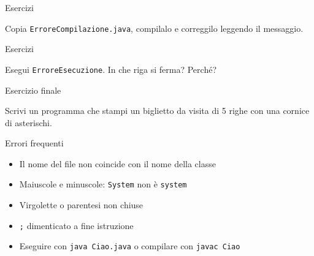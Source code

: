 \documentclass[aspectratio=169,10pt,t]{beamer}
\begin{document}
\begin{frame}{Esercizi}
  \begin{esercizio}
    Copia \texttt{ErroreCompilazione.java}, compilalo e correggilo leggendo il messaggio.
  \end{esercizio}
\end{frame}

\begin{frame}{Esercizi}
  \begin{esercizio}
    Esegui \texttt{ErroreEsecuzione}. In che riga si ferma? Perch\'e?
  \end{esercizio}
\end{frame}

\begin{frame}[fragile]{Esercizio finale}
  \begin{esercizio}
    Scrivi un programma che stampi un biglietto da visita di 5 righe con una cornice di asterischi.
  \end{esercizio}
\end{frame}

\begin{frame}{Errori frequenti}
  \begin{errore}
    \begin{itemize}
      \item Il nome del file non coincide con il nome della classe
      \item Maiuscole e minuscole: \texttt{System} non \`e \texttt{system}
      \item Virgolette o parentesi non chiuse
      \item \texttt{;} dimenticato a fine istruzione
      \item Eseguire con \texttt{java Ciao.java} o compilare con \texttt{javac Ciao}
    \end{itemize}
  \end{errore}
\end{frame}
\end{document}

